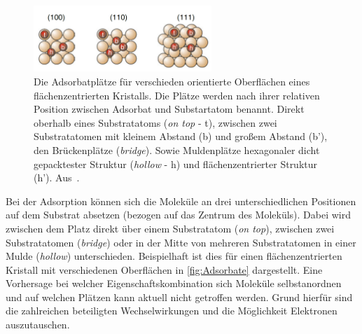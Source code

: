             \begin{figure}
                \centering
                \includegraphics[width=0.6\textwidth]{Adsorbate}
                \caption{Die Adsorbatplätze für verschieden orientierte Oberflächen eines flächenzentrierten Kristalls.
                Die Plätze werden nach ihrer relativen Position zwischen Adsorbat und Substartatom benannt.
                Direkt oberhalb eines Substratatoms (\textit{on top} - t), zwischen zwei Substratatomen mit kleinem Abstand (b) und großem Abstand (b'), den Brückenplätze (\textit{bridge}).
                Sowie Muldenplätze hexagonaler dicht gepacktester Struktur (\textit{hollow} - h) und flächenzentrierter Struktur (h'). Aus~\cite{Fauster}.}
                \label{fig:Adsorbate}
            \end{figure}
            Bei der Adsorption können sich die Moleküle an drei unterschiedlichen Positionen auf dem Substrat absetzen (bezogen auf das Zentrum des Moleküls).
            Dabei wird zwischen dem Platz direkt über einem Substratatom (\textit{on top}), zwischen zwei Substratatomen (\textit{bridge}) oder in der Mitte von mehreren Substratatomen in einer Mulde (\textit{hollow}) unterschieden.
            Beispielhaft ist dies für einen flächenzentrierten Kristall mit verschiedenen Oberflächen in \autoref{fig:Adsorbate} dargestellt.
            Eine Vorhersage bei welcher Eigenschaftskombination sich Moleküle selbstanordnen und auf welchen Plätzen kann aktuell nicht getroffen werden.
            Grund hierfür sind die zahlreichen beteiligten Wechselwirkungen und die Möglichkeit Elektronen auszutauschen. 

